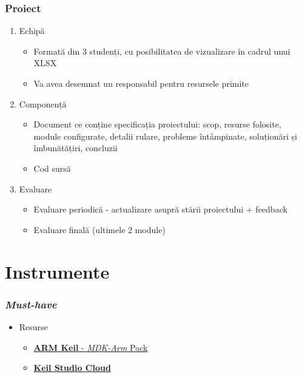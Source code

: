 \documentclass[xcolor={table}]{beamer}
\begin{document}
		\begin{frame}
			\frametitle{Proiect}
			\begin{enumerate}
			    \item Echipă
			    	\begin{itemize}
    			        \item Formată din 3 studenți, cu posibilitatea de vizualizare în cadrul unui XLSX
    			        \item Va avea desemnat un responsabil pentru resursele primite
    			    \end{itemize}
				\item Componență
					\begin{itemize}
    			        \item Document ce conține specificația proiectului: scop, resurse folosite, module configurate, detalii rulare, probleme întâmpinate,  soluționări și îmbunătățiri, concluzii
    			        \item Cod sursă
    			    \end{itemize}
				\item Evaluare
					\begin{itemize}
    			        \item Evaluare periodică - actualizare asupră stării proiectului + feedback
    			        \item Evaluare finală (ultimele 2 module)
    			    \end{itemize}
			\end{enumerate}
		\end{frame}

	\section{Instrumente}
    	\begin{frame}
    		\frametitle{\textit{Must-have}}
    		\begin{itemize}
    		    \item Resurse
    		        \begin{itemize}
        				\item \href{https://www.keil.com/download/product/}{\textbf{ARM Keil} - \textit{MDK-Arm} Pack}
        				\item \href{https://studio.keil.arm.com/}{\textbf{Keil Studio Cloud}}
    		        \end{itemize}
    		\end{itemize}
    	\end{frame}
\end{document}
